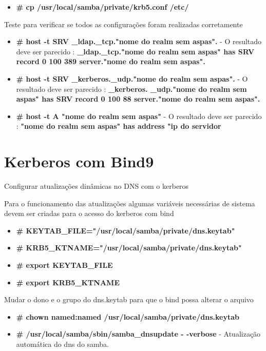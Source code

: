 \begin{itemize}
	\item \textbf{\# cp /usr/local/samba/private/krb5.conf  /etc/}
\end{itemize}

Teste para verificar se todos as configurações foram realizadas corretamente

\begin{itemize}
	\item \textbf{\# host -t SRV \_ldap.\_tcp."nome do realm sem aspas".} - O resultado deve ser parecido : \textbf{\_ldap.\_tcp."nome do realm sem aspas" has SRV record 0 100 389 server."nome do realm sem aspas".}
	\item \textbf{\# host -t SRV \_kerberos.\_udp."nome do realm sem aspas".} - O resultado deve ser parecido : \textbf{\_kerberos. \_udp."nome do realm sem aspas" has SRV record 0 100 88 server."nome do realm sem aspas".}
	\item \textbf{\# host -t A "nome do realm sem aspas"} - O resultado deve ser parecido : \textbf{"nome do realm sem aspas" has address "ip do servidor}
\end{itemize}

\section{Kerberos com Bind9}

Configurar atualizações dinâmicas no DNS com o kerberos

Para o funcionamento das atualizações algumas variáveis necessárias de sistema devem ser criadas para o acesso do kerberos com bind

\begin{itemize}
	\item \textbf{\# KEYTAB\_FILE="/usr/local/samba/private/dns.keytab"}
	\item \textbf{\# KRB5\_KTNAME="/usr/local/samba/private/dns.keytab"}
	\item \textbf{\# export KEYTAB\_FILE}
	\item \textbf{\# export KRB5\_KTNAME}
\end{itemize}

Mudar o dono e o grupo do dns.keytab para que o bind possa alterar o arquivo

\begin{itemize}
	\item \textbf{\# chown named:named /usr/local/samba/private/dns.keytab}
	\item \textbf{\# /usr/local/samba/sbin/samba\_dnsupdate - -verbose} - Atualização automática do dns do samba.
\end{itemize}

